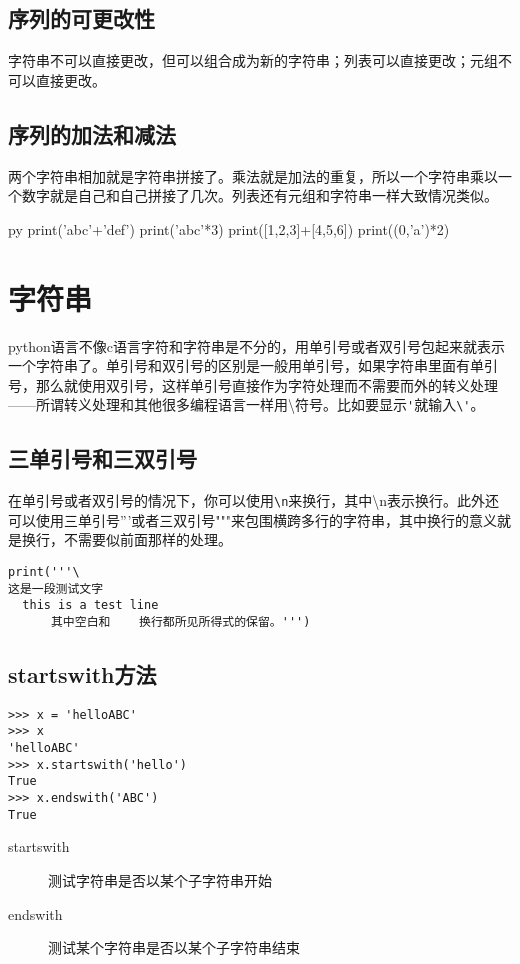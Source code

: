 \documentclass[12pt,oneside]{book}
\begin{document}
\begin{common-format}
\subsection{序列的可更改性}
字符串不可以直接更改，但可以组合成为新的字符串；列表可以直接更改；元组不可以直接更改。


\subsection{序列的加法和减法}
两个字符串相加就是字符串拼接了。乘法就是加法的重复，所以一个字符串乘以一个数字就是自己和自己拼接了几次。列表还有元组和字符串一样大致情况类似。

\begin{xverbatim}[129]{py}
print('abc'+'def')
print('abc'*3)
print([1,2,3]+[4,5,6])
print((0,'a')*2)
\end{xverbatim}


\section{字符串}
python语言不像c语言字符和字符串是不分的，用单引号或者双引号包起来就表示一个字符串了。单引号和双引号的区别是一般用单引号，如果字符串里面有单引号，那么就使用双引号，这样单引号直接作为字符处理而不需要而外的转义处理——所谓转义处理和其他很多编程语言一样用\textbackslash 符号。比如要显示\verb+'+就输入\verb+\'+。

\subsection{三单引号和三双引号}
在单引号或者双引号的情况下，你可以使用\verb+\n+来换行，其中\textbackslash n表示换行。此外还可以使用三单引号'''或者三双引号"""来包围横跨多行的字符串，其中换行的意义就是换行，不需要似前面那样的处理。

\begin{Verbatim}
print('''\
这是一段测试文字
  this is a test line
      其中空白和    换行都所见所得式的保留。''')
\end{Verbatim}


\subsection{startswith方法}
\begin{Verbatim}
>>> x = 'helloABC'
>>> x
'helloABC'
>>> x.startswith('hello')
True
>>> x.endswith('ABC')
True
\end{Verbatim}

\begin{description}
\item[startswith] 测试字符串是否以某个子字符串开始
\item[endswith] 测试某个字符串是否以某个子字符串结束
\end{description}



\end{common-format}
\end{document}
